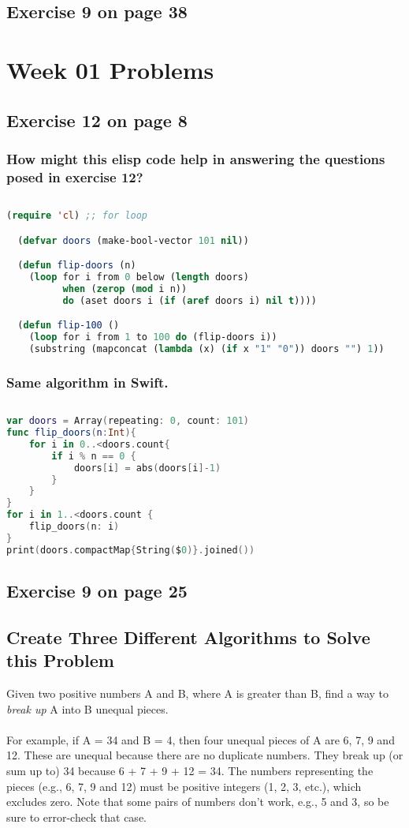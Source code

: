 \documentclass[12pt]{amsart}
\begin{document}
\subsection{Exercise 9 on page 38}
 
 
\section{Week 01 Problems}
\subsection{Exercise 12 on page 8} 

\subsubsection{How might this elisp code help in answering the questions posed in exercise 12?}$ $ 
\begin{lstlisting}[language=lisp, frame=single] 
(require 'cl) ;; for loop

  (defvar doors (make-bool-vector 101 nil))

  (defun flip-doors (n)
    (loop for i from 0 below (length doors)
          when (zerop (mod i n))
          do (aset doors i (if (aref doors i) nil t))))

  (defun flip-100 ()
    (loop for i from 1 to 100 do (flip-doors i))
    (substring (mapconcat (lambda (x) (if x "1" "0")) doors "") 1))
\end{lstlisting}
\pagebreak
\subsubsection{Same algorithm in Swift.}$ $

\begin{lstlisting}[language=Swift, frame=single]
var doors = Array(repeating: 0, count: 101)
func flip_doors(n:Int){
    for i in 0..<doors.count{
        if i % n == 0 {
            doors[i] = abs(doors[i]-1)
        }
    }
}
for i in 1..<doors.count {
    flip_doors(n: i)
}
print(doors.compactMap{String($0)}.joined())
\end{lstlisting}

\subsection{Exercise 9 on page 25} 
\subsection{Create Three Different Algorithms to Solve this Problem}
Given two positive numbers A and B, where A is greater than B, find a way to \textit{break up} A into B unequal pieces.\\\\For example, if A = 34 and B = 4, then four unequal pieces of A are 6, 7, 9 and 12. These are unequal because there are no duplicate numbers. They break up (or sum up to) 34 because 6 + 7 + 9 + 12 = 34. The numbers representing the pieces (e.g., 6, 7, 9 and 12) must be positive integers (1, 2, 3, etc.), which excludes zero. Note that some pairs of numbers don't work, e.g., 5 and 3, so be sure to error-check that case.
\end{document}
